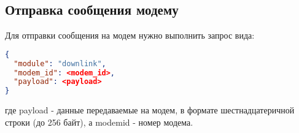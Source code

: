 \subsection{Отправка сообщения модему}

Для отправки сообщения на модем нужно выполнить запрос вида:

\begin{lstlisting}[language=json,firstnumber=1]
{
  "module": "downlink",
  "modem_id": <modem_id>,
  "payload": <payload>
}
\end{lstlisting}

где payload - данные передаваемые на модем, в формате шестнадцатеричной строки (до 256 байт), а modem\textunderscore id - номер модема.